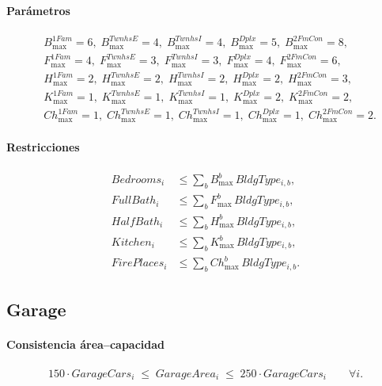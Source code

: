 \paragraph{Parámetros}
\begin{align*}
&B_{\max}^{1Fam}=6,\; B_{\max}^{TwnhsE}=4,\; B_{\max}^{TwnhsI}=4,\; B_{\max}^{Dplx}=5,\; B_{\max}^{2FmCon}=8,\\
&F_{\max}^{1Fam}=4,\; F_{\max}^{TwnhsE}=3,\; F_{\max}^{TwnhsI}=3,\; F_{\max}^{Dplx}=4,\; F_{\max}^{2FmCon}=6,\\
&H_{\max}^{1Fam}=2,\; H_{\max}^{TwnhsE}=2,\; H_{\max}^{TwnhsI}=2,\; H_{\max}^{Dplx}=2,\; H_{\max}^{2FmCon}=3,\\
&K_{\max}^{1Fam}=1,\; K_{\max}^{TwnhsE}=1,\; K_{\max}^{TwnhsI}=1,\; K_{\max}^{Dplx}=2,\; K_{\max}^{2FmCon}=2,\\
&Ch_{\max}^{1Fam}=1,\; Ch_{\max}^{TwnhsE}=1,\; Ch_{\max}^{TwnhsI}=1,\; Ch_{\max}^{Dplx}=1,\; Ch_{\max}^{2FmCon}=2.
\end{align*}
\paragraph{Restricciones}
\begin{align}
Bedrooms_{i}&\leq \sum_{b} B_{\max}^{b}\, BldgType_{i,b},\\
FullBath_{i}&\leq \sum_{b} F_{\max}^{b}\, BldgType_{i,b},\\
HalfBath_{i}&\leq \sum_{b} H_{\max}^{b}\, BldgType_{i,b},\\
Kitchen_{i}&\leq \sum_{b} K_{\max}^{b}\, BldgType_{i,b},\\
FirePlaces_{i}&\leq \sum_{b} Ch_{\max}^{b}\, BldgType_{i,b}.
\end{align}

\subsection{Garage}
\paragraph{Consistencia área–capacidad}
\begin{align}
150 \cdot GarageCars_{i} \;\le\; GarageArea_{i} \;\le\; 250 \cdot GarageCars_{i} \qquad \forall i.
\end{align}
